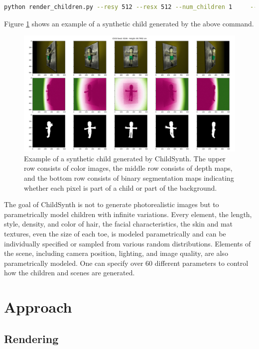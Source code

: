 \documentclass{article}
\begin{document}
\begin{lstlisting}[language=bash]
python render_children.py --resy 512 --resx 512 --num_children 1     --output_dir ./output 
\end{lstlisting}

Figure \ref{fig:child_0} shows an example of a synthetic child generated by the above command.

\begin{figure}[]
    \centering
    \includegraphics[width=\textwidth]{plots/child_0.png}
    \caption{Example of a synthetic child generated by ChildSynth. The upper row consists of color images, the middle row consists of depth maps, and the bottom row consists of binary segmentation maps indicating whether each pixel is part of a child or part of the background.}
    \label{fig:child_0}
\end{figure}

The goal of ChildSynth is not to generate photorealistic images but to parametrically model children with infinite variations. Every element, the length, style, density, and color of hair, the facial characteristics, the skin and mat textures, even the size of each toe, is modeled parametrically and can be individually specified or sampled from various random distributions. Elements of the scene, including camera position, lighting, and image quality, are also parametrically modeled. One can specify over $60$ different parameters to control how the children and scenes are generated.

\section{Approach}
\subsection{Rendering}
\end{document}
